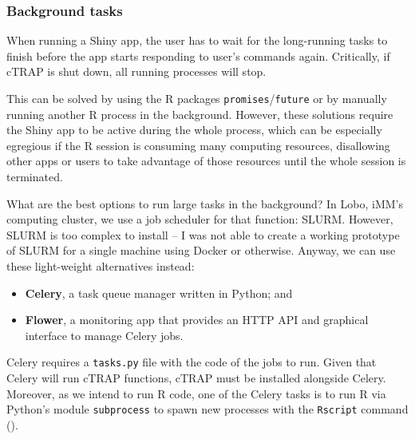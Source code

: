 \subsubsection{Background tasks}
\label{subsec:background-tasks}

When running a Shiny app, the user has to wait for the long-running tasks to finish before the app starts responding to user's commands again. Critically, if cTRAP is shut down, all running processes will stop.

This can be solved by using the R packages \texttt{promises}/\texttt{future} or by manually running another R process in the background. However, these solutions require the Shiny app to be active during the whole process, which can be especially egregious if the R session is consuming many computing resources, disallowing other apps or users to take advantage of those resources until the whole session is terminated.

What are the best options to run large tasks in the background? In Lobo, iMM's computing cluster, we use a job scheduler for that function: SLURM. However, SLURM is too complex to install -- I was not able to create a working prototype of SLURM for a single machine using Docker or otherwise. Anyway, we can use these light-weight alternatives instead:

\begin{itemize}
	\item \textbf{Celery}, a task queue manager written in Python; and
	\item \textbf{Flower}, a monitoring app that provides an HTTP API and graphical interface to manage Celery jobs.
\end{itemize}

Celery requires a \texttt{tasks.py} file with the code of the jobs to run. Given that Celery will run cTRAP functions, cTRAP must be installed alongside Celery. Moreover, as we intend to run R code, one of the Celery tasks is to run R via Python's module \texttt{subprocess} to spawn new processes with the \texttt{Rscript} command ().

